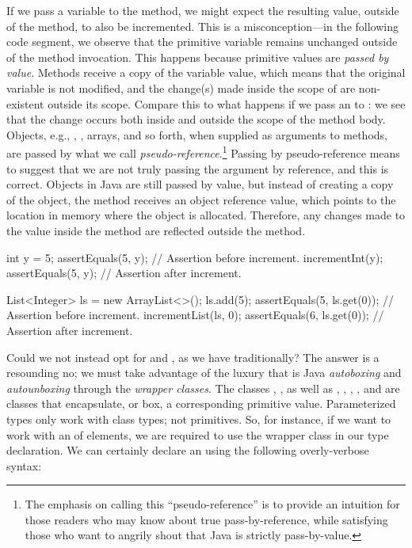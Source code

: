 If we pass a variable to the  method, we might expect the resulting value, outside of the method, to also be incremented. 
This is a misconception---in the following code segment, we observe that the primitive variable  remains unchanged outside of the method invocation. 
This happens because primitive values are \emph{passed by value}. 
Methods receive a copy of the variable value, which means that the original variable is not modified, and the change(s) made inside the scope of  are non-existent outside its scope. 
Compare this to what happens if we pass an  to : we see that the change occurs both inside and outside the scope of the method body. 
Objects, e.g., , , arrays, and so forth, when supplied as arguments to methods, are passed by what we call \emph{pseudo-reference}.\footnote{The emphasis on calling this ``pseudo-reference'' is to provide an intuition for those readers who may know about true pass-by-reference, while satisfying those who want to angrily shout that Java is strictly pass-by-value.} 
Passing by pseudo-reference means to suggest that we are not truly passing the argument by reference, and this is correct. 
Objects in Java are still passed by value, but instead of creating a copy of the object, the method receives an object reference value, which points to the location in memory where the object is allocated. 
Therefore, any changes made to the value inside the method are reflected outside the method.

\begin{verbnobox}[\small]
int y = 5;
assertEquals(5, y);         // Assertion before increment.
incrementInt(y);
assertEquals(5, y);         // Assertion after increment.
\end{verbnobox}

\begin{verbnobox}[\small]
List<Integer> ls = new ArrayList<>();
ls.add(5);
assertEquals(5, ls.get(0)); // Assertion before increment.
incrementList(ls, 0);
assertEquals(6, ls.get(0)); // Assertion after increment.
\end{verbnobox}

Could we not instead opt for  and , as we have traditionally? 
The answer is a resounding no; we must take advantage of the luxury that is Java \emph{autoboxing} and \emph{autounboxing} through the \emph{wrapper classes}. 
The classes , , as well as , , , , and  are classes that encapsulate, or box, a corresponding primitive value. 
Parameterized types only work with class types; not primitives. 
So, for instance, if we want to work with an  of  elements, we are required to use the  wrapper class in our type declaration. 
We can certainly declare an  using the following overly-verbose syntax:

